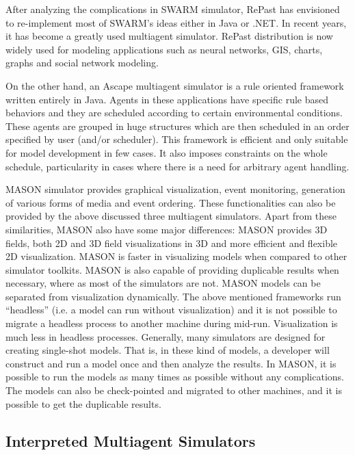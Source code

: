 After analyzing the complications in SWARM simulator, RePast has envisioned to re-implement most of SWARM's ideas either in Java or .NET. In recent years, it has become a greatly used multiagent simulator. RePast distribution is now widely used for modeling applications such as neural networks, GIS, charts, graphs and social network modeling.

On the other hand, an Ascape multiagent simulator is a rule oriented framework written entirely in Java. Agents in these applications have specific rule based behaviors and they are scheduled according to certain environmental conditions. These agents are grouped in huge structures which are then scheduled in an order specified by user (and/or scheduler). This framework is efficient and only suitable for model development in few cases. It also imposes constraints on the whole schedule, particularity in cases where there is a need for arbitrary agent handling.

MASON simulator provides graphical visualization, event monitoring, generation of various forms of media and event ordering. These functionalities can also be provided by the above discussed three multiagent simulators. Apart from these similarities, MASON also have some major differences: MASON provides 3D fields, both 2D and 3D field visualizations in 3D and more efficient and flexible 2D visualization. MASON is faster in visualizing models when compared to other simulator toolkits. MASON is also capable of providing duplicable results when necessary, where as most of the simulators are not. MASON models can be separated from visualization dynamically. The above mentioned frameworks run ``headless'' (i.e. a model can run without visualization) and it is not possible to migrate a headless process to another machine during mid-run. Visualization is much less in headless processes. Generally, many simulators are designed for creating single-shot models. That is, in these kind of models, a developer will construct and run a model once and then analyze the results. In MASON, it is possible to run the models as many times as possible without any complications. The models can also be check-pointed and migrated to other machines, and it is possible to get the duplicable results.


\subsection{Interpreted Multiagent Simulators}

